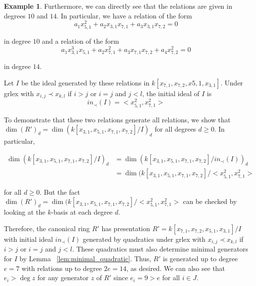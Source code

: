 \documentclass{amsart}
\theoremstyle{plain}
\theoremstyle{definition}
\newtheorem{example}[thm]{Example}
\theoremstyle{remark}
\numberwithin{equation}{section}
\begin{document}
\begin{example}

Furthermore, we can directly see that the relations are given
in degrees $10$ and $14$. In particular, we have a relation
of the form
\[
	a_1 x_{5, 1}^2 + a_2 x_{3, 1} x_{7, 1} + a_3 x_{3, 1} x_{7, 2} = 0
\]

\noindent
in degree $10$ and a relation of the form
\[
	a_1 x_{3, 1}^3 x_{5, 1} + a_2 x_{7, 1}^2 + a_3 x_{7, 1} x_{7, 2} + a_4 x_{7, 2}^2 = 0
\]

\noindent
in degree $14$.

Let $I$ be the ideal generated by these relations in
$k[x_{7, 1}, x_{7, 2}, x{5, 1}, x_{3, 1}]$. Under grlex with
$x_{i, j} \prec x_{k, l}$ if $i > j$ or $i = j$ and $j < l$,
the initial ideal of $I$ is
\[
	in_\prec(I) = < x_{5, 1}^2, x_{7, 1}^2 >
\]

To demonstrate that these two relations generate all 
relations, we show that $\dim (R')_d = \dim
(k[x_{3, 1}, x_{5, 1}, x_{7, 1}, x_{7, 2}] / I)_d$ for all degrees
$d \geq 0$. In particular, 

\begin{align*}
	\dim (k[x_{3, 1}, x_{5, 1}, x_{7, 1}, x_{7, 2}] / I)_d &=
	\dim (k[x_{3, 1}, x_{5, 1}, x_{7, 1}, x_{7, 2}]	/ in_\prec(I))_d \\
	&= \dim (k[x_{3, 1}, x_{5, 1}, x_{7, 1}, x_{7, 2}] / < x_{5, 1}^2,
	x_{7, 1}^2 >
\end{align*}

\noindent
for all $d \geq 0$. But the fact $\dim (R')_d = \dim (k[x_{3, 1},
x_{5, 1}, x_{7, 1}, x_{7, 2}] / < x_{5, 1}^2,	x_{7, 1}^2 >$ can
be checked by looking at the $k$-basis at each degree $d$.

Therefore, the canonical ring $R'$ has presentation $R' =
k[x_{7, 1}, x_{7, 2}, x_{5, 1}, x_{3, 1}] / I$ with
initial ideal $in_\prec(I)$ generated by quadratics under grlex
with $x_{i, j} \prec x_{k, l}$ if $i > j$ or $i = j$ and $j < l$.
These quadratics must also determine minimal generators for $I$ by
Lemma ~\ref{lem:minimal_quadratic}. Thus, $R'$ is generated up to
degree $e = 7$ with relations up to degree $2e = 14$, as desired.
We can also see that $e_i > \deg z$ for any generator $z$ of $R'$
since $e_i = 9 > e$ for all $i \in J$.


\end{example}
\end{document}
